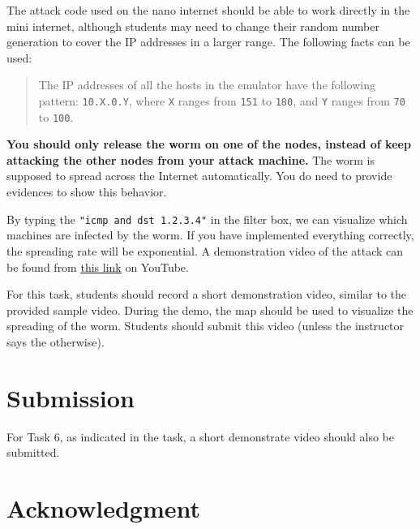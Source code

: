 The attack code used on the nano internet should be able to 
work directly in the mini internet, 
although students may need to change their random number
generation to cover the IP addresses in a larger range. 
The following facts can be used: 

\begin{quote}
    The IP addresses of all the hosts in the emulator have the following
    pattern: \texttt{10.X.0.Y}, where \texttt{X} ranges from 
    \texttt{151} to \texttt{180}, 
    and \texttt{Y} ranges from \texttt{70} to \texttt{100}.  
\end{quote}


\textbf{You should only release the worm on one of the nodes, instead of keep
attacking the other nodes from your attack machine.}
The worm is supposed to spread across the Internet automatically.
You do need to provide evidences to show this behavior.

By typing the \texttt{"icmp and dst 1.2.3.4"} in the filter box,
we can visualize which machines are infected by the worm. 
If you have implemented 
everything correctly, the spreading rate will be exponential. 
A demonstration video of the attack can be found from 
\href{https://youtu.be/2VZV-aFoVjk}{\underline{this link}} 
on YouTube.


For this task, students should record a short
demonstration video, similar to the provided 
sample video. During the demo, the 
map should be used to visualize the spreading
of the worm. Students should submit this 
video (unless the instructor says the otherwise). 




\section{Submission}


For Task 6, as indicated in the task, 
a short demonstrate video should also be submitted.



\section*{Acknowledgment} 

